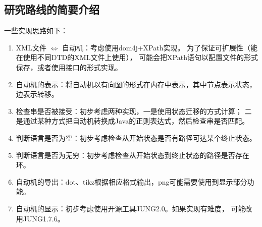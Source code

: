 \documentclass[12pt,a4paper]{article}
\begin{document}
\begin{CJK}{UTF8}{song}
    \section{研究路线的简要介绍}
    一些实现思路如下：
    \begin{enumerate}
    \item XML文件 $\Leftrightarrow$ 自动机：考虑使用dom4j+XPath实现。
        为了保证可扩展性（能在使用不同DTD的XML文件上使用），
        可能会把XPath语句以配置文件的形式保存，或者使用接口的形式实现。
    \item 自动机的表示：将自动机以有向图的形式在内存中表示，其中节点表示状态，边表示转移。
    \item 检查串是否被接受：初步考虑两种实现，一是使用状态迁移的方式计算；
        二是通过某种方式把自动机转换成Java的正则表达式，然后检查串是否匹配。
    \item 判断语言是否为空：初步考虑检查从开始状态是否有路径可达某个终止状态。
    \item 判断语言是否为无穷：初步考虑检查从开始状态到终止状态的路径是否存在环。
    \item 自动机的导出：dot、tikz根据相应格式输出，png可能需要使用到显示部分功能。
    \item 自动机的显示：初步考虑使用开源工具JUNG2.0。如果实现有难度，
        可能改用JUNG1.7.6。
    \end{enumerate}

\newpage
\end{CJK}
\end{document}
